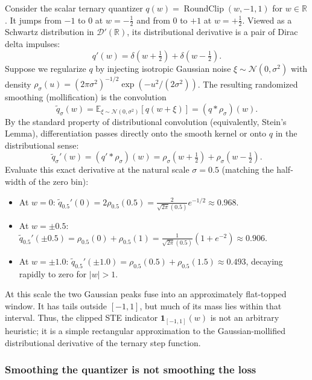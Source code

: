 Consider the scalar ternary quantizer $q(w) = \operatorname{RoundClip}(w, -1, 1)$ for $w \in \mathbb{R}$. It jumps from $-1$ to $0$ at $w = -\tfrac{1}{2}$ and from $0$ to $+1$ at $w = +\tfrac{1}{2}$. Viewed as a Schwartz distribution in $\mathcal{D}'(\mathbb{R})$, its distributional derivative is a pair of Dirac delta impulses:
\begin{equation}
    q'(w) = \delta\!\left(w + \tfrac{1}{2}\right) + \delta\!\left(w - \tfrac{1}{2}\right).
\end{equation}
Suppose we regularize $q$ by injecting isotropic Gaussian noise $\xi \sim \mathcal{N}(0, \sigma^2)$ with density $\rho_\sigma(u) = (2\pi\sigma^2)^{-1/2} \exp(-u^2/(2\sigma^2))$. The resulting randomized smoothing (mollification) is the convolution
\[
    \widetilde{q}_\sigma(w) = \mathbb{E}_{\xi \sim \mathcal{N}(0, \sigma^2)}[q(w + \xi)] = (q * \rho_\sigma)(w).
\]
By the standard property of distributional convolution (equivalently, Stein's Lemma), differentiation passes directly onto the smooth kernel or onto $q$ in the distributional sense:
\begin{equation}
    \widetilde{q}_\sigma'(w) = (q' * \rho_\sigma)(w) = \rho_\sigma\!\left(w + \tfrac{1}{2}\right) + \rho_\sigma\!\left(w - \tfrac{1}{2}\right).
\end{equation}
Evaluate this exact derivative at the natural scale $\sigma = 0.5$ (matching the half-width of the zero bin):
\begin{itemize}
    \item At $w = 0$: $\widetilde{q}_{0.5}'(0) = 2 \rho_{0.5}(0.5) = \frac{2}{\sqrt{2\pi}(0.5)} e^{-1/2} \approx 0.968$.
    \item At $w = \pm 0.5$: $\widetilde{q}_{0.5}'(\pm 0.5) = \rho_{0.5}(0) + \rho_{0.5}(1) = \frac{1}{\sqrt{2\pi}(0.5)}(1 + e^{-2}) \approx 0.906$.
    \item At $w = \pm 1.0$: $\widetilde{q}_{0.5}'(\pm 1.0) = \rho_{0.5}(0.5) + \rho_{0.5}(1.5) \approx 0.493$, decaying rapidly to zero for $|w| > 1$.
\end{itemize}
At this scale the two Gaussian peaks fuse into an approximately flat-topped window. It has tails outside $[-1,1]$, but much of its mass lies within that interval. Thus, the clipped STE indicator $\mathbf{1}_{[-1,1]}(w)$ is not an arbitrary heuristic; it is a simple rectangular approximation to the Gaussian-mollified distributional derivative of the ternary step function.

\subsubsection{Smoothing the quantizer is not smoothing the loss}

